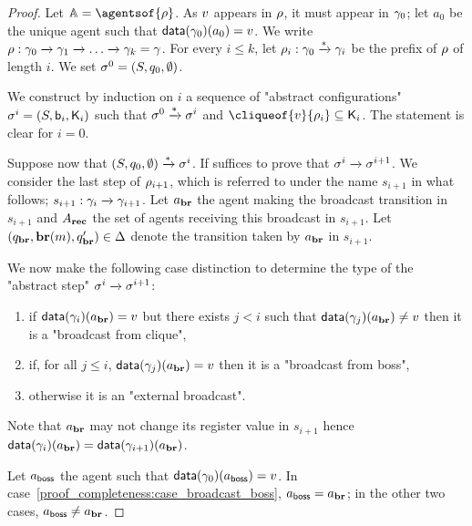 \begin{proof}
	Let $\agents = \agentsof{\run}$.	
	As $v$ appears in $\rho$, it must appear in $\gamma_0$; let $a_0$ be the unique agent such that $\mathsf{data}(\gamma_0)(a_0) = v$. We write $\rho : \gamma_0 \xrightarrow{} \gamma_1 \xrightarrow{} \dots \xrightarrow{} \gamma_k = \gamma$. For every $i \leq k$, let $\rho_i : \gamma_0 \xrightarrow{*} \gamma_i$ be the prefix of $\rho$ of length $i$. We set $\sigma^0 = (S, q_0, \emptyset)$.
	
	We construct by induction on $i$ a sequence of "abstract configurations" $\sigma^i = (S, \mathsf{b}_i, \mathsf{K}_i)$ such that $\sigma^0 \xrightarrow{*} \sigma^i$ and $\cliqueof{\aval}{\run_i} \subseteq \clique_i$.
	The statement is clear for $i=0$. 
	
	Suppose now that $(S, q_0, \emptyset) \xrightarrow{*} \sigma^i$. 
	If suffices to prove that $\sigma^i \xrightarrow{} \sigma^{i+1}$. 
	We consider the last step of $\rho_{i+1}$, which is referred to under the name $s_{i+1}$ in what follows; $s_{i+1}: \gamma_i \xrightarrow{} \gamma_{i+1}$. Let $a_{\textbf{br}}$ the agent making the broadcast transition in $s_{i+1}$ and $A_{\textbf{rec}}$ the set of agents receiving this broadcast in $s_{i+1}$. Let $(q_{\textbf{br}}, \textbf{br}(m), q_{\textbf{br}}') \in \Delta$ denote the transition taken by $a_{\textbf{br}}$ in $s_{i+1}$.
	
	We now make the following case distinction to determine the type of the "abstract step" $\sigma^i \xrightarrow{} \sigma^{i+1}$:
	\begin{enumerate}
		\item\label{proof_completeness:case_broadcast_clique} if $\mathsf{data}(\gamma_{i})(a_{\textbf{br}}) = v$ but there exists $j<i$ such that $\mathsf{data}(\gamma_{j})(a_{\textbf{br}}) \ne v$ then it is a "broadcast from clique",
		\item\label{proof_completeness:case_broadcast_boss} if, for all $j \leq i$, $\mathsf{data}(\gamma_j)(a_{\textbf{br}}) = v$ then it is a "broadcast from boss",
		\item\label{proof_completeness:case_external_broadcast} otherwise it is an "external broadcast". 
	\end{enumerate}
	Note that $a_{\textbf{br}}$ may not change its register value in $s_{i+1}$ hence $\mathsf{data}(\gamma_i)(a_{\textbf{br}}) = \mathsf{data}(\gamma_{i+1})(a_{\textbf{br}})$. 
	
	Let $a_{\mathsf{boss}}$ the agent such that $\mathsf{data}(\gamma_0)(a_{\mathsf{boss}}) = v$. In case~\ref{proof_completeness:case_broadcast_boss}, $a_{\mathsf{boss}} = a_{\textbf{br}}$; in the other two cases, $a_{\mathsf{boss}} \ne a_{\textbf{br}}$. 
	

\end{proof}
